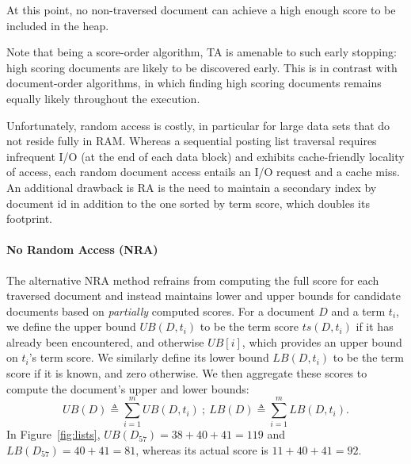 At this point, no non-traversed document can achieve a high enough score to be included in the heap. 

Note that being a score-order algorithm,  TA is amenable to such early stopping: high scoring documents are likely to be discovered early.
This is in contrast with document-order algorithms, in which finding high scoring documents remains equally likely throughout the execution.

Unfortunately, random access is costly,  in particular for large data sets that do not reside fully in RAM.
Whereas a sequential posting list traversal requires infrequent I/O (at the end of each data block) and exhibits cache-friendly locality of access,  each random document access entails an I/O request and a cache miss.  
An additional drawback is RA is the need to maintain a secondary index by document id in addition to the one sorted by term score, which doubles its footprint. 

\paragraph{No Random Access (NRA)} 
The alternative NRA method %
refrains from computing the full score for each traversed document and instead
maintains lower and upper bounds for candidate documents based on {\em partially\/} computed scores. 
For a document $D$ and a term $t_i$, we define the upper bound $UB(D, t_i)$ to be the term score $ts(D, t_i)$ if it has already been encountered, and otherwise $UB[i]$, which provides an upper bound on $t_i$'s term score. We similarly define its lower bound $LB(D, t_i)$ to be the term score if it is known, and zero otherwise. We then aggregate these scores to compute the document's upper and lower bounds:
\[
UB(D) \triangleq \sum_{i=1}^m UB(D, t_i) \ ; \  
LB(D) \triangleq \sum_{i=1}^m LB(D, t_i).
\] 
In Figure~\ref{fig:lists}, $UB(D_{57}) = 38+40+41 = 119$ and $LB(D_{57}) = 40+41 = 81$, whereas its actual score  is $11+ 40+41 = 92$.

